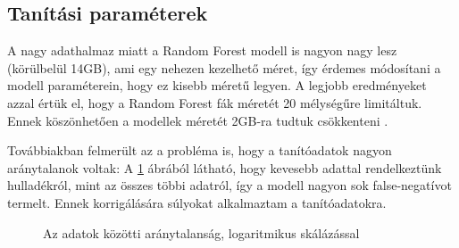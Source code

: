 \subsection{Tanítási paraméterek}

A nagy adathalmaz miatt a Random Forest modell is nagyon nagy lesz (körülbelül 14GB), ami egy nehezen kezelhető méret, így érdemes módosítani a modell paraméterein, hogy ez kisebb méretű legyen. A legjobb eredményeket azzal értük el, hogy a Random Forest fák méretét 20 mélységűre limitáltuk. Ennek köszönhetően a modellek méretét 2GB-ra tudtuk csökkenteni .

Továbbiakban felmerült az a probléma is, hogy a tanítóadatok nagyon aránytalanok voltak: A \ref{fig:unbalanced-data} ábrából látható, hogy kevesebb adattal rendelkeztünk hulladékról, mint az összes többi adatról, így a modell nagyon sok false-negatívot termelt. Ennek korrigálására súlyokat alkalmaztam a tanítóadatokra.

\datacounts

\begin{figure}
    \caption{Az adatok közötti aránytalanság, logaritmikus skálázással}
    \label{fig:unbalanced-data}
\end{figure}